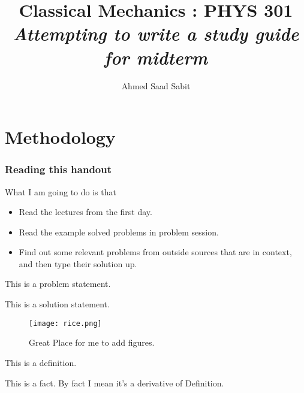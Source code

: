 \documentclass[10pt]{article}
\begin{document}
	\title{{Classical Mechanics : PHYS 301}\\{\normalsize{\itshape 
Attempting to write a study guide for midterm
	}}}
	\author{Ahmed Saad Sabit}
	\maketitle
	\newpage
	\pagestyle{fancynotes}

\part{Methodology}
\section{Reading this handout} 
What I am going to do is that
\begin{itemize}
	\item Read the lectures from the first day. 
	\item Read the example solved problems in problem session. 
	\item Find out some relevant problems from outside sources that are in context, and then type their solution up. 
\end{itemize}
\begin{prob}
	This is a problem statement.
\end{prob}
\begin{solu}
	This is a solution statement. 
\end{solu}
\begin{margintable}
	\begin{figure}[H]
		\centering
		\texttt{[image: rice.png]}
		\caption{Great Place for me to add figures.}
		\label{fig:rice-png}
	\end{figure}
\end{margintable}
\begin{definition}
	This is a definition. 
\end{definition}
\begin{fact}
This is a fact. By fact I mean it's a derivative of Definition.
\end{fact}



\newpage
\end{document}
